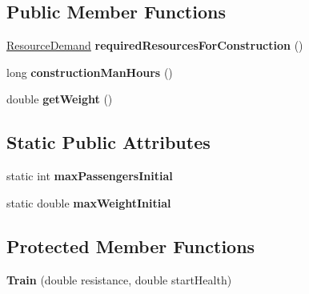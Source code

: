 \subsection*{Public Member Functions}
\begin{DoxyCompactItemize}
\item 
\hyperlink{classuniverse_1_1_resource_demand}{Resource\+Demand} {\bfseries required\+Resources\+For\+Construction} ()\hypertarget{classtools_1_1vehicles_1_1roadgoing_1_1_train_a1bca535a4a2b8d233138171103978c1e}{}\label{classtools_1_1vehicles_1_1roadgoing_1_1_train_a1bca535a4a2b8d233138171103978c1e}

\item 
long {\bfseries construction\+Man\+Hours} ()\hypertarget{classtools_1_1vehicles_1_1roadgoing_1_1_train_aa2cbf2ed1b6329aa53079b8cb03c519e}{}\label{classtools_1_1vehicles_1_1roadgoing_1_1_train_aa2cbf2ed1b6329aa53079b8cb03c519e}

\item 
double {\bfseries get\+Weight} ()\hypertarget{classtools_1_1vehicles_1_1roadgoing_1_1_train_a7767a13f068b79df40152a0e9d3b7b1e}{}\label{classtools_1_1vehicles_1_1roadgoing_1_1_train_a7767a13f068b79df40152a0e9d3b7b1e}

\end{DoxyCompactItemize}
\subsection*{Static Public Attributes}
\begin{DoxyCompactItemize}
\item 
static int {\bfseries max\+Passengers\+Initial}\hypertarget{classtools_1_1vehicles_1_1roadgoing_1_1_train_a8dbee81429cddde980d952eee49b7342}{}\label{classtools_1_1vehicles_1_1roadgoing_1_1_train_a8dbee81429cddde980d952eee49b7342}

\item 
static double {\bfseries max\+Weight\+Initial}\hypertarget{classtools_1_1vehicles_1_1roadgoing_1_1_train_a04dc4d4349e543038cb845621a846d4c}{}\label{classtools_1_1vehicles_1_1roadgoing_1_1_train_a04dc4d4349e543038cb845621a846d4c}

\end{DoxyCompactItemize}
\subsection*{Protected Member Functions}
\begin{DoxyCompactItemize}
\item 
{\bfseries Train} (double resistance, double start\+Health)\hypertarget{classtools_1_1vehicles_1_1roadgoing_1_1_train_a7b98e18dfe23a5ad813f38645fd35420}{}\label{classtools_1_1vehicles_1_1roadgoing_1_1_train_a7b98e18dfe23a5ad813f38645fd35420}

\end{DoxyCompactItemize}
